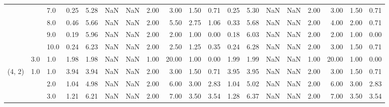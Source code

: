 \begin{tabular}{lllrrrrrrrrrrrrrrrr}
       &     & 7.0  &      0.25 &       5.28 &               NaN &                NaN & 2.00 &   3.00 &             1.50 &                         0.71 &      0.25 &       5.30 &               NaN &                NaN & 2.00 &   3.00 &             1.50 &                         0.71 \\
       &     & 8.0  &      0.46 &       5.66 &               NaN &                NaN & 2.00 &   5.50 &             2.75 &                         1.06 &      0.33 &       5.68 &               NaN &                NaN & 2.00 &   4.00 &             2.00 &                         0.71 \\
       &     & 9.0  &      0.19 &       5.96 &               NaN &                NaN & 2.00 &   2.00 &             1.00 &                         0.00 &      0.18 &       6.03 &               NaN &                NaN & 2.00 &   2.00 &             1.00 &                         0.00 \\
       &     & 10.0 &      0.24 &       6.23 &               NaN &                NaN & 2.00 &   2.50 &             1.25 &                         0.35 &      0.24 &       6.28 &               NaN &                NaN & 2.00 &   3.00 &             1.50 &                         0.71 \\
       & 3.0 & 1.0  &      1.98 &       1.98 &               NaN &                NaN & 1.00 &  20.00 &             1.00 &                         0.00 &      1.99 &       1.99 &               NaN &                NaN & 1.00 &  20.00 &             1.00 &                         0.00 \\
(4, 2) & 1.0 & 1.0  &      3.94 &       3.94 &               NaN &                NaN & 2.00 &   3.00 &             1.50 &                         0.71 &      3.95 &       3.95 &               NaN &                NaN & 2.00 &   3.00 &             1.50 &                         0.71 \\
       &     & 2.0  &      1.04 &       4.98 &               NaN &                NaN & 2.00 &   6.00 &             3.00 &                         2.83 &      1.04 &       5.02 &               NaN &                NaN & 2.00 &   6.00 &             3.00 &                         2.83 \\
       &     & 3.0  &      1.21 &       6.21 &               NaN &                NaN & 2.00 &   7.00 &             3.50 &                         3.54 &      1.28 &       6.37 &               NaN &                NaN & 2.00 &   7.00 &             3.50 &                         3.54 \\

\end{tabular}
